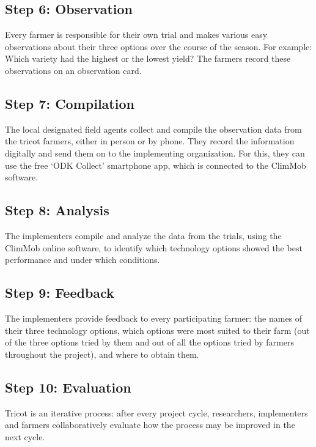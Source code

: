 \documentclass[
]{book}
\begin{document}
\subsection{Step 6: Observation}\label{step-6-observation}

Every farmer is responsible for their own trial and makes various easy observations about their three options over the course of the season. For example: Which variety had the highest or the lowest yield? The farmers record these observations on an observation card.

\subsection{Step 7: Compilation}\label{step-7-compilation}

The local designated field agents collect and compile the observation data from the tricot farmers, either in person or by phone. They record the information digitally and send them on to the implementing organization. For this, they can use the free `ODK Collect' smartphone app, which is connected to the ClimMob software.

\subsection{Step 8: Analysis}\label{step-8-analysis}

The implementers compile and analyze the data from the trials, using the ClimMob online software, to identify which technology options showed the best performance and under which conditions.

\subsection{Step 9: Feedback}\label{step-9-feedback}

The implementers provide feedback to every participating farmer: the names of their three technology options, which options were most suited to their farm (out of the three options tried by them and out of all the options tried by farmers throughout the project), and where to obtain them.

\subsection{Step 10: Evaluation}\label{step-10-evaluation}

Tricot is an iterative process: after every project cycle, researchers, implementers and farmers collaboratively evaluate how the process may be improved in the next cycle.
\end{document}
